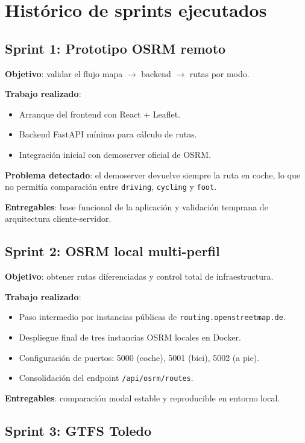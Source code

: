 \section{Histórico de sprints ejecutados}

\subsection{Sprint 1: Prototipo OSRM remoto}

\textbf{Objetivo}: validar el flujo mapa $\rightarrow$ backend $\rightarrow$ rutas por modo.

\textbf{Trabajo realizado}:
\begin{itemize}
  \item Arranque del frontend con React + Leaflet.
  \item Backend FastAPI mínimo para cálculo de rutas.
  \item Integración inicial con demoserver oficial de OSRM.
\end{itemize}

\textbf{Problema detectado}: el demoserver devuelve siempre la ruta en coche, lo que no permitía comparación entre \texttt{driving}, \texttt{cycling} y \texttt{foot}.

\textbf{Entregables}: base funcional de la aplicación y validación temprana de arquitectura cliente-servidor.

\subsection{Sprint 2: OSRM local multi-perfil}

\textbf{Objetivo}: obtener rutas diferenciadas y control total de infraestructura.

\textbf{Trabajo realizado}:
\begin{itemize}
  \item Paso intermedio por instancias públicas de \texttt{routing.openstreetmap.de}.
  \item Despliegue final de tres instancias OSRM locales en Docker.
  \item Configuración de puertos: 5000 (coche), 5001 (bici), 5002 (a pie).
  \item Consolidación del endpoint \texttt{/api/osrm/routes}.
\end{itemize}

\textbf{Entregables}: comparación modal estable y reproducible en entorno local.

\subsection{Sprint 3: GTFS Toledo}

